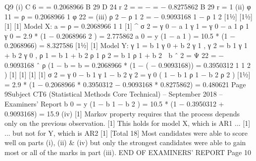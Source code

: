 Q9
(i)
C 6
= = 0.2068966
B 29
D
24
r 2 = =
−
=
− 0.8275862
B
29
r =
1
(ii)
φ 11 = ρ =
0.2068966
1
φ 22 =
(iii)
ρ 2 − ρ 1 2
= − 0.9093168
1 − ρ 1 2
[11⁄2]
[11⁄2]
[1]
[1]
Model X:
a =
ρ =
0.2068966
1
1
[1]
^
σ 2 = γ 0 − a 1 γ 1 = γ 0 − a 1 ρ 1 γ 0 = 2.9 * (1 − 0.2068966 2 ) = 2.775862
a 0 = y (1 − a 1 ) = 10.5 * (1 − 0.2068966) = 8.327586
[11⁄2]
[1]
Model Y:
γ 1 =
b 1 γ 0 + b 2 γ 1 ,
γ 2 =
b 1 γ 1 + b 2 γ 0 ,
ρ 1 =
b 1 + b 2 ρ 1
ρ 2 =
b 1 ρ 1 + b 2

b ˆ 2 =
Ψ 22 =
− 0.9093168
ˆ ρ (1 − b =
b =
0.2068966 * (1 − ( − 0.9093168))
= 0.3950312
1
1
2 )
[1]
[1]
[1]
[1]
σ 2 = γ 0 − b 1 γ 1 − b 2 γ 2 = γ 0 ( 1 − b 1 ρ 1 − b 2 ρ 2 )
[11⁄2]
=
2.9 * (1 − 0.2068966 * 0.3950312 − 0.9093168 * 0.8275862) =
0.480621
Page 9Subject CT6 (Statistical Methods Core Technical) – September 2018 – Examiners’ Report
b 0 = y (1 − b 1 − b 2 ) = 10.5 * (1 − 0.3950312 + 0.9093168) = 15.9
(iv)
[1]
Markov property requires that the process depends only on the previous
observation.
[1]
This holds for model X, which is AR1 ...
[1]
... but not for Y, which is AR2
[1]
[Total 18]
Most candidates were able to score well on parts (i), (ii) & (iv) but only the strongest
candidates were able to gain most or all of the marks in part (iii).
END OF EXAMINERS’ REPORT
Page 10
